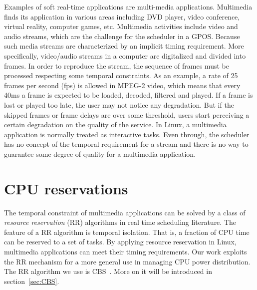 Examples of soft real-time applications are multi-media applications. 
%
Multimedia finds its application in various areas including DVD player,
video conference, virtual reality, computer games, etc. Multimedia 
activities include video and audio streams, which are the challenge 
for the scheduler in a GPOS. Because such media streams are characterized 
by an implicit timing requirement. More specifically, video/audio streams 
in a computer are digitalized and divided into frames. In order to 
reproduce the stream, the sequence of frames must be processed 
respecting some temporal constraints. As an example, a rate of 25 frames 
per second (fps) is allowed in MPEG-2 video, which means that every 40ms 
a frame is expected to be loaded, decoded, filtered and played. If a frame 
is lost or played too late, the user may not notice any degradation. But 
if the skipped frames or frame delays are over some threshold, users start 
perceiving a certain degradation on the quality of the service. In Linux, 
a multimedia application is normally treated as interactive tasks. Even 
through, the scheduler has no concept of the temporal requirement for a 
stream and there is no way to guarantee some degree of quality for a 
multimedia application.    

\section{CPU reservations}
 
%
%
The temporal constraint of multimedia applications can be solved by
a class of \emph{resource reservation} (RR) algorithms in real time 
scheduling literature. The feature of a RR algorithm is temporal 
isolation. That is, a fraction of CPU time can be reserved to a set
of tasks. By applying resource reservation in Linux, multimedia
applications can meet their timing requirements. Our work exploits
the RR mechanism for a more general use in managing CPU power
distribution. The RR algorithm we use is CBS~\cite{AbeniB98}. More 
on it will be introduced in section~\ref{sec:CBS}.

